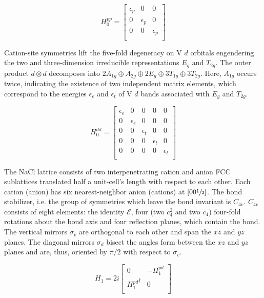 \documentclass[preprint,showpacs,preprintnumbers,superscriptaddress,prb,floatfix,aps]{revtex4-1}
\newcommand*{\id}{\mathcal{E}}
\begin{document}
\begin{equation}
H_0^{pp} =
\begin{bmatrix}
\epsilon_{p} & 0 & 0 \\
0 & \epsilon_{p} & 0 \\
0 & 0 & \epsilon_{p} \\
\end{bmatrix}
\end{equation}

Cation-site symmetries lift the five-fold degeneracy on V $d$ orbitals engendering the two and three-dimension irreducible representations $E_g$ and $T_{2g}$. The outer product $d \otimes d$ decomposes into $2 A_{1g} \oplus A_{2g} \oplus 2 E_g \oplus 3 T_{1g} \oplus 3 T_{2g}$. Here, $A_{1g}$ occurs twice, indicating the existence of two independent matrix elements, which correspond to the energies $\epsilon_e$ and $\epsilon_t$ of V $d$ bands associated with $E_g$ and $T_{2g}$.

\begin{equation}
H_0^{dd} =
\begin{bmatrix}
 \epsilon_{e} & 0 & 0 & 0 & 0 \\
 0 & \epsilon_{e} & 0 & 0 & 0 \\
 0 & 0 & \epsilon_{t} & 0 & 0 \\
 0 & 0 & 0 & \epsilon_{t} & 0 \\
 0 & 0 & 0 & 0 & \epsilon_{t} \\
\end{bmatrix}
\end{equation}

The NaCl lattice consists of two interpenetrating cation and anion FCC sublattices translated half a unit-cell's length with respect to each other. Each cation (anion) has six nearest-neighbor anion (cations) at $\left[0 0 \sfrac{1}{2}\right]$. The bond stabilizer, i.e. the group of symmetries which leave the bond invariant is $C_{4v}$. $C_{4v}$ consists of eight elements: the identity $\id$, four (two $c_{4}^2$ and two $c_4$) four-fold rotations about the bond axis and four reflection planes, which contain the bond. The vertical mirrors $\sigma_v$ are orthogonal to each other and span the $xz$ and $yz$ planes. The diagonal mirrors $\sigma_d$ bisect the angles form between the $xz$ and $yz$ planes and are, thus, oriented by $\pi/2$ with respect to $\sigma_v$.

\begin{equation}
H_1 = 2i
\begin{bmatrix}
0                  & -H_1^{pd} \\
{H_1^{pd}}^\dagger &  0        \\
\end{bmatrix}
\end{equation}
\end{document}
